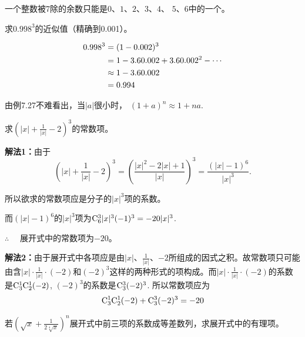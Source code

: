 \begin{remark}
一个整数被7除的余数只能是$0$、$1$、$2$、$3$、$4$、 $5$、$6$中的一个。
\end{remark}

\begin{example}
    求$ 0.998^{3} $的近似值（精确到0.001）。
\end{example}

\begin{solution}
\[\begin{split}
    0.998^{3}&=(1-0.002)^{3}\\
& = 1-3\x  0.002+3\x  0.002^{2}-\cdots\\
&\approx  1-3\x  0.002\\
&=0.994
\end{split}\]
\end{solution}

\begin{remark}
    由例7.27不难看出，当$|a|$很小时， $(1+a)^{n}\approx 1+na$.
\end{remark}

\begin{example}
    求$ \left(|x|+\frac{1}{|x|}-2\right)^{3}$的常数项。
\end{example}

\begin{solution}
\textbf{解法1：}由于
\[
\left(|x|+\frac{1}{|x|}-2\right)^{3}=\left(\frac{|x|^{2}-2|x|+1}{|x|}\right)^{3}=\frac{(|x|-1)^{6}}{|x|^{3}}.\]

所以欲求的常数项应是分子的$|x|^{3}$项的系数。

而$(|x|-1)^{6} $的$ |x|^{3} $项为$\comb{6}{3}|x|^{3}(-1)^{3}=-20|x|^{3}$.

$\therefore\quad$ 展开式中的常数项为$-20$。

\textbf{解法2：}由于展开式中各项应是由$|x|$、$\frac{1}{|x|}$、$-2$所组成的因式之积。故常数项只可能由含$ |x|\cdot \frac{1}{|x|}\cdot (-2) $和$ (-2)^{3} $这样的两种形式的项构成。而$ |x|\cdot \frac{1}{|x|}\cdot (-2) $的系数是$\comb{3}{1}\comb{2}{1}(-2)$,  $(-2)^{3} $的系数是$\comb{3}{3}(-2)^{3}$. 所以常数项应为
\[\comb{3}{1}\comb{2}{1}(-2)+\comb{3}{3}(-2)^{3}=-20\]
\end{solution}

\begin{example}
    若$ \left(\sqrt{x}+\frac{1}{2\sqrt[4]{x}}\right)^{n} $展开式中前三项的系数成等差数列，求展开式中的有理项。
\end{example}


